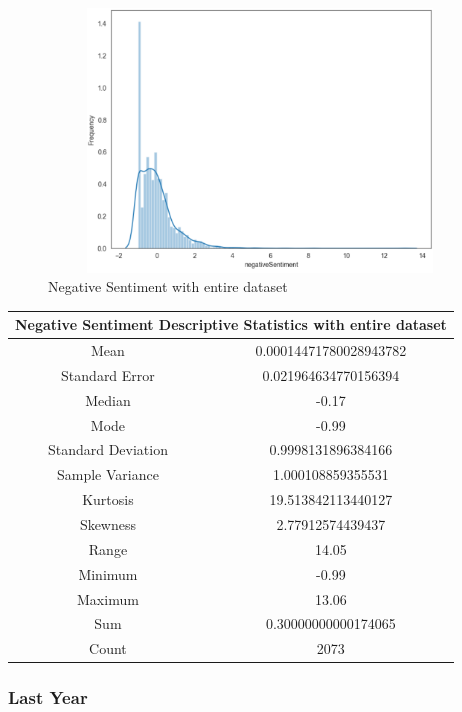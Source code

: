 \begin{figure}[h!]
    \centering
    \includegraphics[width=15cm,height=7cm,keepaspectratio]{resultsEvaluation/negativeDescMax.png}
    \caption{Negative Sentiment with entire dataset}
    \label{fig:appendix_negativeDescMax}
\end{figure}
\begin{center}
\begin{tabular}{ c c }
\hline
\multicolumn{2}{|c|}{Negative Sentiment Descriptive Statistics with entire dataset} \\
\hline
Mean & 0.00014471780028943782 \\
Standard Error & 0.021964634770156394 \\
Median & -0.17 \\
Mode & -0.99 \\
Standard Deviation & 0.9998131896384166 \\
Sample Variance & 1.000108859355531 \\
Kurtosis & 19.513842113440127 \\
Skewness & 2.77912574439437 \\
Range & 14.05 \\
Minimum & -0.99 \\
Maximum & 13.06 \\
Sum & 0.30000000000174065 \\
Count & 2073
\end{tabular}
\end{center}

\subsubsection{Last Year}

